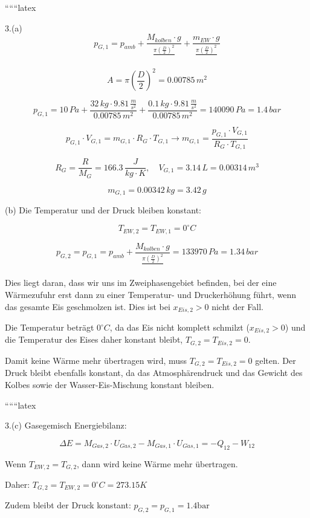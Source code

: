 
``````latex


3.(a)
\[
p_{G,1} = p_{amb} + \frac{M_{kolben} \cdot g}{\frac{\pi \left( \frac{D}{2} \right)^2}{}} + \frac{m_{EW} \cdot g}{\frac{\pi \left( \frac{D}{2} \right)^2}{}}
\]

\[
A = \pi \left( \frac{D}{2} \right)^2 = 0.00785 \, m^2
\]

\[
p_{G,1} = 10 \, Pa + \frac{32 \, kg \cdot 9.81 \, \frac{m}{s^2}}{0.00785 \, m^2} + \frac{0.1 \, kg \cdot 9.81 \, \frac{m}{s^2}}{0.00785 \, m^2} = 140090 \, Pa = 1.4 \, bar
\]

\[
p_{G,1} \cdot V_{G,1} = m_{G,1} \cdot R_G \cdot T_{G,1} \rightarrow m_{G,1} = \frac{p_{G,1} \cdot V_{G,1}}{R_G \cdot T_{G,1}}
\]

\[
R_G = \frac{R}{M_G} = 166.3 \, \frac{J}{kg \cdot K}, \quad V_{G,1} = 3.14 \, L = 0.00314 \, m^3
\]

\[
m_{G,1} = 0.00342 \, kg = 3.42 \, g
\]

(b) Die Temperatur und der Druck bleiben konstant:

\[
T_{EW,2} = T_{EW,1} = 0^\circ C
\]

\[
p_{G,2} = p_{G,1} = p_{amb} + \frac{M_{kolben} \cdot g}{\frac{\pi \left( \frac{D}{2} \right)^2}{}} = 133970 \, Pa = 1.34 \, bar
\]

Dies liegt daran, dass wir uns im Zweiphasengebiet befinden, bei der eine Wärmezufuhr erst dann zu einer Temperatur- und Druckerhöhung führt, wenn das gesamte Eis geschmolzen ist. Dies ist bei \( x_{Eis,2} > 0 \) nicht der Fall.

Die Temperatur beträgt \( 0^\circ C \), da das Eis nicht komplett schmilzt (\( x_{Eis,2} > 0 \)) und die Temperatur des Eises daher konstant bleibt, \( T_{G,2} = T_{Eis,2} = 0 \).

Damit keine Wärme mehr übertragen wird, muss \( T_{G,2} = T_{Eis,2} = 0 \) gelten. Der Druck bleibt ebenfalls konstant, da das Atmosphärendruck und das Gewicht des Kolbes sowie der Wasser-Eis-Mischung konstant bleiben.

``````latex


3.(c) Gasegemisch Energiebilanz:

\[
\Delta E = M_{Gas,2} \cdot U_{Gas,2} - M_{Gas,1} \cdot U_{Gas,1} = -Q_{12} - W_{12}
\]

Wenn \( T_{EW,2} = T_{G,2} \), dann wird keine Wärme mehr übertragen.

Daher: \( T_{G,2} = T_{EW,2} = 0^\circ C = 273.15 K \)

Zudem bleibt der Druck konstant: \( p_{G,2} = p_{G,1} = 1.4 \text{bar} \)

